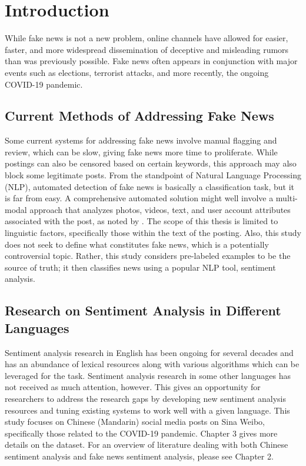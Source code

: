 \documentclass [11pt, proquest] {uwthesis}[2020/02/24]
\begin{document}
 
\chapter {Introduction}
 
While fake news is not a new problem, online channels have allowed for easier, faster, and more widespread dissemination of deceptive and misleading rumors than was previously possible. Fake news often appears in conjunction with major events such as elections, terrorist attacks, and more recently, the ongoing COVID-19 pandemic.

\section{Current Methods of Addressing Fake News}
 Some current systems for addressing fake news involve manual flagging and review, which can be slow, giving fake news more time to proliferate. While postings can also be censored based on certain keywords, this approach may also block some legitimate posts. From the  standpoint of Natural Language Processing (NLP), automated detection of fake news is basically a classification task, but it is far from easy. A comprehensive automated solution might well involve a multi-modal approach that analyzes photos, videos, text, and user account attributes associated with the post, as noted by \cite{Ajao2019}. The scope of this thesis is limited to linguistic factors, specifically those within the text of the posting. Also, this study does not seek to define what constitutes fake news, which is a potentially controversial topic. Rather, this study considers pre-labeled examples to be the source of truth; it then classifies news using a popular NLP tool, sentiment analysis.
 
 
\section{Research on Sentiment Analysis in Different Languages}
Sentiment analysis research in English has been ongoing for several decades and has an abundance of lexical resources along with various algorithms which can be leveraged for the task. Sentiment analysis research in some other languages has not received as much attention, however. This gives an opportunity for researchers to address the research gaps by developing new sentiment analysis resources and tuning existing systems to work well with a given language. This study focuses on Chinese (Mandarin) social media posts on Sina Weibo, specifically those related to the COVID-19 pandemic. Chapter 3 gives more details on the dataset. For an overview of literature dealing with both Chinese sentiment analysis and fake news sentiment analysis, please see Chapter 2.
 
\end{document}
